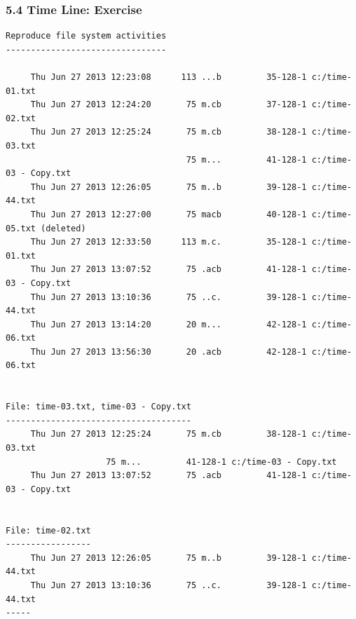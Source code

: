 \begin{frame}[fragile]
  \frametitle{5.4 Time Line: Exercise}
  \begin{lstlisting}[basicstyle=\tiny]
Reproduce file system activities
--------------------------------
  
     Thu Jun 27 2013 12:23:08      113 ...b         35-128-1 c:/time-01.txt
     Thu Jun 27 2013 12:24:20       75 m.cb         37-128-1 c:/time-02.txt
     Thu Jun 27 2013 12:25:24       75 m.cb         38-128-1 c:/time-03.txt
                                    75 m...         41-128-1 c:/time-03 - Copy.txt
     Thu Jun 27 2013 12:26:05       75 m..b         39-128-1 c:/time-44.txt
     Thu Jun 27 2013 12:27:00       75 macb         40-128-1 c:/time-05.txt (deleted)
     Thu Jun 27 2013 12:33:50      113 m.c.         35-128-1 c:/time-01.txt
     Thu Jun 27 2013 13:07:52       75 .acb         41-128-1 c:/time-03 - Copy.txt
     Thu Jun 27 2013 13:10:36       75 ..c.         39-128-1 c:/time-44.txt
     Thu Jun 27 2013 13:14:20       20 m...         42-128-1 c:/time-06.txt
     Thu Jun 27 2013 13:56:30       20 .acb         42-128-1 c:/time-06.txt


File: time-03.txt, time-03 - Copy.txt
-------------------------------------
     Thu Jun 27 2013 12:25:24       75 m.cb         38-128-1 c:/time-03.txt
				    75 m...         41-128-1 c:/time-03 - Copy.txt
     Thu Jun 27 2013 13:07:52       75 .acb         41-128-1 c:/time-03 - Copy.txt


File: time-02.txt
-----------------
     Thu Jun 27 2013 12:26:05       75 m..b         39-128-1 c:/time-44.txt
     Thu Jun 27 2013 13:10:36       75 ..c.         39-128-1 c:/time-44.txt
-----
  \end{lstlisting}
\end{frame}


